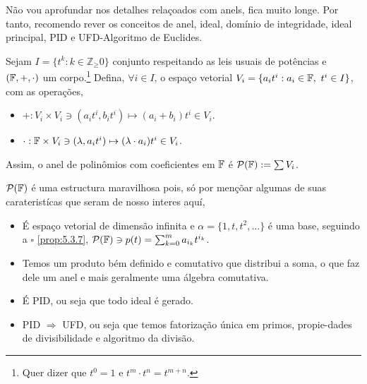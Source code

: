 Não vou aprofundar nos detalhes relaçoados com anels, fica muito longe. Por tanto, recomendo rever os conceitos de anel, ideal, domínio de integridade, ideal principal, PID e UFD-Algoritmo de Euclides. 
\begin{definition}
    Sejam \(I = \{t^k: k\in \mathbb{Z}_\geq0\}\) conjunto respeitando as leis usuais de potências e \((\mathbb{F},+,\cdot)\) um corpo.\footnote{Quer dizer que \(t^0 =1\) e \(t^m\cdot t^n=t^{m+n}\).  } Defina, \(\forall i \in I\), o espaço vetorial \(V_i = \{a_it^i: a_i \in \mathbb{F}, \  t^i \in I\}\), com as operações, 
    \begin{itemize}
        \item \(+: V_i \times V_i \ni (a_it^i , b_it^i) \mapsto (a_i+b_i)t^i \in V_i\). 
        \item \(\cdot: \mathbb{F} \times V_i \ni (\lambda, a_it^i) \mapsto (\lambda\cdot a_i) t^i \in V_i\). 
    \end{itemize} 
    Assim, o anel de polinômios com coeficientes em \(\mathbb{F}\) é \(\mathcal{P}(\mathbb{F}) := \sum V_i\).  
\end{definition}

\newcommand{\Pol}{\mathcal{P}(\F)}
\begin{note}
    \(\Pol\) é uma estructura maravilhosa pois, só por mençõar algumas de suas carateristícas que seram de nosso interes aquí,  
    \begin{itemize}
        \item É espaço vetorial de dimensão infinita e \(\alpha = \{1, t, t^2, \ldots\}\) é uma base, seguindo a \(\square \) \ref{prop:5.3.7}, \(\Pol \ni p(t) = \sum^m_{k=0}a_{i_k}t^{i_k}\). 
        \item Temos um produto bém definido e comutativo que distribui a soma, o que faz dele um anel e mais geralmente uma álgebra comutativa.  
        \item É PID, ou seja que todo ideal é gerado. 
        \item PID \(\Rightarrow \) UFD, ou seja que temos fatorização única em primos, propie-dades de divisibilidade e algoritmo da divisão.
    \end{itemize}
\end{note}

